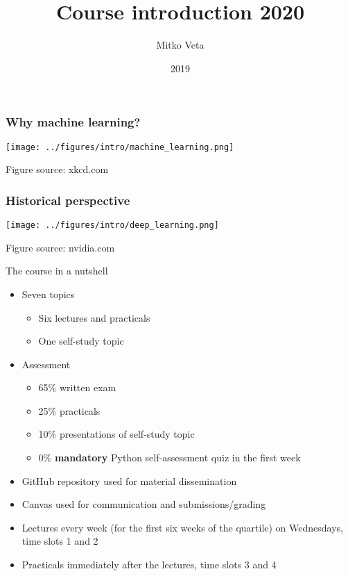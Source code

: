 \documentclass[notes]{beamer}          %
\title{Course introduction 2020}
\author{Mitko Veta}
\institute{Eindhoven University of Technology

Department of Biomedical Engineering}
\date{2019}
\begin{document}
 
\frame{\titlepage}

\begin{frame}
\frametitle{Why machine learning?}
\begin{center}
\texttt{[image: ../figures/intro/machine\_learning.png]}
\end{center}
{\tiny Figure source: xkcd.com}
\end{frame}

\begin{frame}
\frametitle{Historical perspective}
\begin{center}
\texttt{[image: ../figures/intro/deep\_learning.png]}
\end{center}
{\tiny Figure source: nvidia.com}
\end{frame}

\begin{frame}{The course in a nutshell}
\begin{itemize}
    \item Seven topics
    \begin{itemize}
        \item Six lectures and practicals
        \item One self-study topic
    \end{itemize}
    \item{Assessment}
        \begin{itemize}
            \item 65\% written exam
            \item 25\% practicals
            \item 10\% presentations of self-study topic
            \item 0\% \textbf{mandatory} Python self-assessment quiz in the first week
        \end{itemize}
    \item GitHub repository used for material dissemination
    \item Canvas used for communication and submissions/grading
    \item Lectures every week (for the first six weeks of the quartile) on Wednesdays, time slots 1 and 2 
    \item Practicals immediately after the lectures, time slots 3 and 4
    
\end{itemize}
\end{frame}
\end{document}
